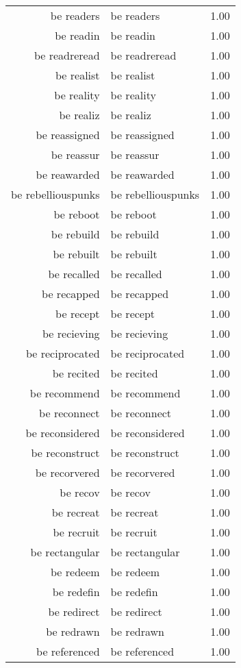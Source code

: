 \begin{table}[ht]
\begin{tabular}{rlr}
  be readers & be readers & 1.00 \\ 
  be readin & be readin & 1.00 \\ 
  be readreread & be readreread & 1.00 \\ 
  be realist & be realist & 1.00 \\ 
  be reality & be reality & 1.00 \\ 
  be realiz & be realiz & 1.00 \\ 
  be reassigned & be reassigned & 1.00 \\ 
  be reassur & be reassur & 1.00 \\ 
  be reawarded & be reawarded & 1.00 \\ 
  be rebelliouspunks & be rebelliouspunks & 1.00 \\ 
  be reboot & be reboot & 1.00 \\ 
  be rebuild & be rebuild & 1.00 \\ 
  be rebuilt & be rebuilt & 1.00 \\ 
  be recalled & be recalled & 1.00 \\ 
  be recapped & be recapped & 1.00 \\ 
  be recept & be recept & 1.00 \\ 
  be recieving & be recieving & 1.00 \\ 
  be reciprocated & be reciprocated & 1.00 \\ 
  be recited & be recited & 1.00 \\ 
  be recommend & be recommend & 1.00 \\ 
  be reconnect & be reconnect & 1.00 \\ 
  be reconsidered & be reconsidered & 1.00 \\ 
  be reconstruct & be reconstruct & 1.00 \\ 
  be recorvered & be recorvered & 1.00 \\ 
  be recov & be recov & 1.00 \\ 
  be recreat & be recreat & 1.00 \\ 
  be recruit & be recruit & 1.00 \\ 
  be rectangular & be rectangular & 1.00 \\ 
  be redeem & be redeem & 1.00 \\ 
  be redefin & be redefin & 1.00 \\ 
  be redirect & be redirect & 1.00 \\ 
  be redrawn & be redrawn & 1.00 \\ 
  be referenced & be referenced & 1.00 \\ 

\end{tabular}
\end{table}
